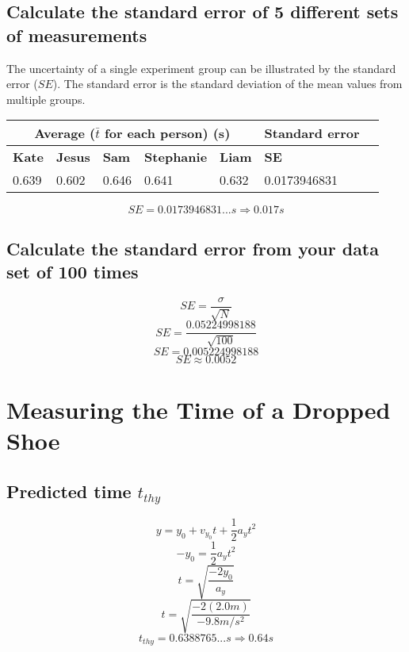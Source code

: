 \documentclass[11pt, letterpaper, includehead]{article}
\begin{document}
\subsection{Calculate the standard error of 5 different sets of measurements}
The uncertainty of a single experiment group can be illustrated by the standard
error ($SE$). The standard error is the standard deviation of the mean values
from multiple groups.
\begin{center}
  \begin{tabular}{|   m{2cm}  |  m{2cm}  |  m{2cm}  |  m{2cm}  |  m{2cm}  |  m{2cm}  | m{2cm}| }
    \hline
    \multicolumn{5}{|c|}{\textbf{Average ($\bar{t}$ for each person) (s)}} & \multicolumn{1}{|c|}{\textbf{Standard error}}\\
    \hline
    \textbf{Kate} & \textbf{Jesus} & \textbf{Sam} & \textbf{Stephanie} & \textbf{Liam} & \textbf{SE}  \\
    \hline
    0.639         & 0.602          & 0.646        & 0.641              & 0.632         & 0.0173946831 \\  %
    \hline
  \end{tabular}
\end{center}

$$SE = 0.0173946831...s \Rightarrow \boxed{0.017s}$$

\subsection{Calculate the standard error from your data set of 100 times}
$$SE = \frac{\sigma}{\sqrt{N}}$$
$$SE = \frac{0.05224998188}{\sqrt{100}}$$
$$SE = 0.005224998188$$
$$SE \approx 0.0052$$\pagebreak %

\section{Measuring the Time of a Dropped Shoe}

\subsection{Predicted time $t_{thy}$} %
$$y       = y_0 + v_{y_0}t + \frac{1}{2}a_yt^2$$
$$-y_0    = \frac{1}{2}a_yt^2$$
$$t       = \sqrt{\frac{-2y_0}{a_y}}$$
$$t       = \sqrt{\frac{-2(2.0m)}{-9.8m/s^2}}$$
$${t_{thy} = 0.6388765...s \Rightarrow  \boxed{0.64s}}$$
\end{document}
